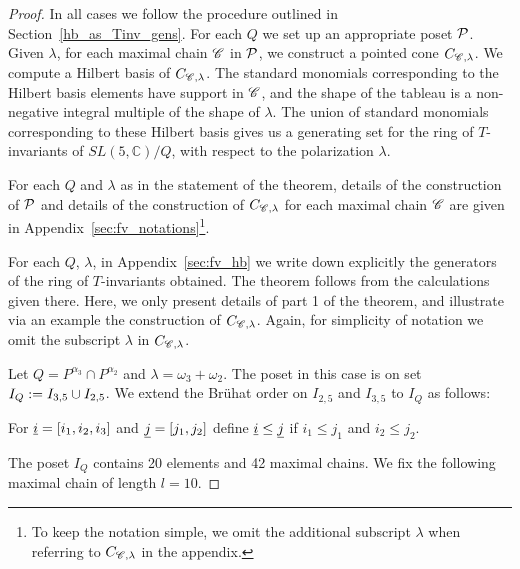 \begin{proof}
    In all cases we follow the procedure outlined in Section~\ref{hb_as_Tinv_gens}. For each $Q$ we set up an appropriate poset ${\cal P}$. Given $\lambda$, for each maximal chain $\mathscr{C}$ in ${\cal P}$, we construct a pointed cone $C_{\mathscr{C}, \lambda}$. We compute a Hilbert basis of $C_{\mathscr{C}, \lambda}$.  The standard monomials corresponding to the Hilbert basis elements have support in $\mathscr{C}$, and the shape of the tableau is a non-negative integral multiple of the shape of $\lambda$. The union of standard monomials corresponding to these Hilbert basis gives us a generating set for the ring of $T$-invariants of $SL(5, \mathbb{C})/Q$, with respect to the polarization $\lambda$. 
    
For each $Q$ and $\lambda$ as in the statement of the theorem, details of the construction of ${\cal P}$ and details of the construction of  $C_{\mathscr{C}, \lambda}$ for each maximal chain $\mathscr{C}$ are given in Appendix~\ref{sec:fv_notations}\footnote{To keep the notation simple, we omit the additional subscript $\lambda$ when referring to $C_{\mathscr{C}, \lambda}$ in the appendix.}.
    
For each $Q$, $\lambda$, in Appendix~\ref{sec:fv_hb} we write down explicitly the generators of the ring of $T$-invariants obtained. The theorem follows from the calculations given there. Here, we only present details of part 1 of the theorem, and illustrate via an example the construction of $C_{\mathscr{C}, \lambda}$. Again, for simplicity of notation we omit the subscript $\lambda$ in  $C_{\mathscr{C}, \lambda}$.

 Let \(Q = P^{\alpha_3} \cap P^{\alpha_2}\) and \(\lambda = \omega_3 + \omega_2\). The poset in this case is on set \(I_{Q} := I_{3,5}\cup I_{2,5}\).
    We extend the Br\"{u}hat order on \(I_{2,5}\) and \(I_{3,5}\) to \(I_{Q}\) as follows:
\begin{center}
    For ${\underline i}=[i_1,i_2,i_3]$ and ${\underline j}=[j_1,j_2]$ define ${\underline i} \leq {\underline j}$ if $i_1 \leq j_1$ and $i_2 \leq j_2$.
\end{center}
    The poset \(I_{Q}\) contains 20 elements and 42 maximal chains.
    We fix the following maximal chain of length \(l=10\).
    

\end{proof}
